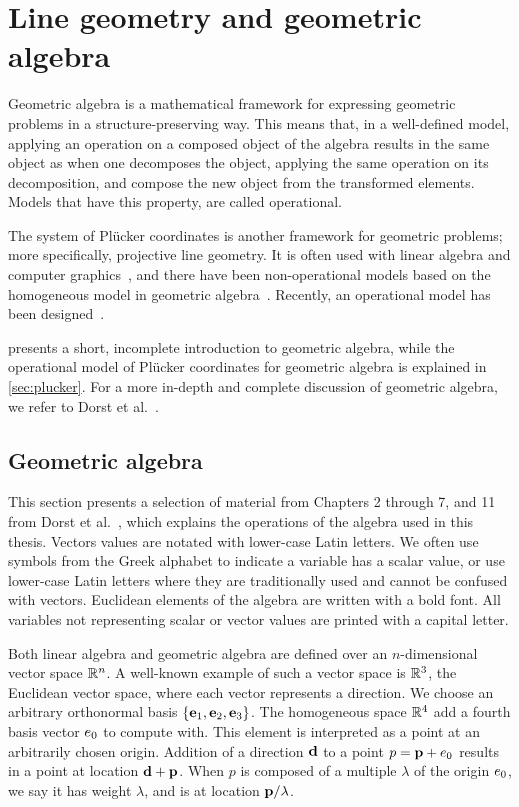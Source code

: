 \section{Line geometry and geometric algebra}
\label{ch:background}

Geometric algebra is a mathematical framework for expressing geometric problems in a structure-preserving way.  This means that, in a well-defined model, applying an operation on a composed object of the algebra results in the same object as when one decomposes the object, applying the same operation on its decomposition, and compose the new object from the transformed elements.  Models that have this property, are called operational.

The system of Pl\"ucker coordinates is another framework for geometric problems; more specifically, projective line geometry.  It is often used with linear algebra and computer graphics~\cite{Shoemake}, and there have been non-operational models based on the homogeneous model in geometric algebra~\cite[Chapter 12]{TheBook}.  Recently, an operational model has been designed~\cite{Hongbo}.

 presents a short, incomplete introduction to geometric algebra, while the operational model of Pl\"ucker coordinates for geometric algebra is explained in \autoref{sec:plucker}.  For a more in-depth and complete discussion of geometric algebra, we refer to Dorst et al.~\cite{TheBook}.

\subsection{Geometric algebra}
\label{sec:intro-ga}
This section presents a selection of material from Chapters 2 through 7, and 11 from Dorst et al.~\cite{TheBook}, which explains the operations of the algebra used in this thesis.  Vectors values are notated with lower-case Latin letters.  We often use symbols from the Greek alphabet to indicate a variable has a scalar value, or use lower-case Latin letters where they are traditionally used and cannot be confused with vectors.  Euclidean elements of the algebra are written with a bold font.  All variables not representing scalar or vector values are printed with a capital letter.

Both linear algebra and geometric algebra are defined over an $n${-\hskip0pt\relax}dimensional vector space $\mathbb{R}^n$.  A well-known example of such a vector space is $\mathbb{R}^3$, the Euclidean vector space, where each vector represents a direction.  We choose an arbitrary orthonormal basis $\{\mathbf{e}_1, \mathbf{e}_2, \mathbf{e}_3\}$.  The homogeneous space $\mathbb{R}^4$ add a fourth basis vector $e_0$ to compute with.  This element is interpreted as a point at an arbitrarily chosen origin.  Addition of a direction $\mathbf{d}$ to a point $p = \mathbf{p} + e_0$ results in a point at location $\mathbf{d} + \mathbf{p}$.  When $p$ is composed of a multiple $\lambda$ of the origin $e_0$, we say it has weight $\lambda$, and is at location $\mathbf{p} / \lambda$.  

